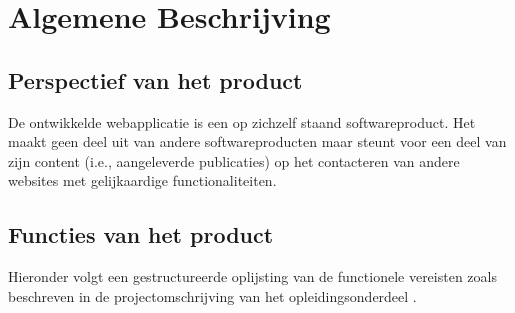 \documentclass{article}
\begin{document}
\clearpage

\section{Algemene Beschrijving}

\subsection{Perspectief van het product}
De ontwikkelde webapplicatie is een op zichzelf staand softwareproduct. Het maakt geen deel uit van andere softwareproducten maar steunt voor een deel van zijn content (i.e., aangeleverde publicaties) op het contacteren van andere websites met gelijkaardige functionaliteiten. \newline
\\

\subsection{Functies van het product}
\label{subsec:userRequirements}

Hieronder volgt een gestructureerde oplijsting van de functionele vereisten zoals beschreven in de projectomschrijving van het opleidingsonderdeel \cite{Xtreport:organisatie}.

\renewcommand{\labelitemi}{$\diamond$}
\renewcommand{\labelitemii}{$\bullet$}
\renewcommand{\labelitemiii}{$\cdot$}
\end{document}
